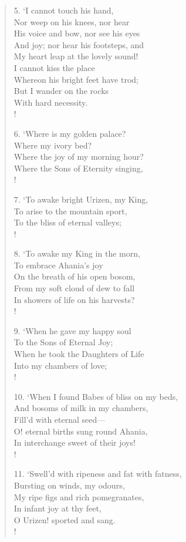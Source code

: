 \documentclass[9pt]{extarticle}
\begin{document}
\begin{verse}
\begin{altverse}
		5. ‘I cannot touch his hand,\\
		Nor weep on his knees, nor hear\\
		His voice and bow, nor see his eyes\\
		And joy; nor hear his footsteps, and\\
		My heart leap at the lovely sound!\\
		I cannot kiss the place\\
		Whereon his bright feet have trod;\\
		But I wander on the rocks\\
		With hard necessity.\\!
		
		6. ‘Where is my golden palace?\\
		Where my ivory bed?\\
		Where the joy of my morning hour?\\
		Where the Sons of Eternity singing,\\!
		
		7. ‘To awake bright Urizen, my King,\\
		To arise to the mountain sport,\\
		To the bliss of eternal valleys;\\!
		
		8. ‘To awake my King in the morn,\\
		To embrace Ahania’s joy\\
		On the breath of his open bosom,\\
		From my soft cloud of dew to fall\\
		In showers of life on his harvests?\\!
		
		9. ‘When he gave my happy soul\\
		To the Sons of Eternal Joy;\\
		When he took the Daughters of Life\\
		Into my chambers of love;\\!
		
		10. ‘When I found Babes of bliss on my beds,\\
		And bosoms of milk in my chambers,\\
		Fill’d with eternal seed—\\
		O! eternal births sung round Ahania,\\
		In interchange sweet of their joys!\\!
		
		11. ‘Swell’d with ripeness and fat with fatness,\\
		Bursting on winds, my odours,\\
		My ripe figs and rich pomegranates,\\
		In infant joy at thy feet,\\
		O Urizen! sported and sang.\\!
		

\end{altverse}
\end{verse}
\end{document}
